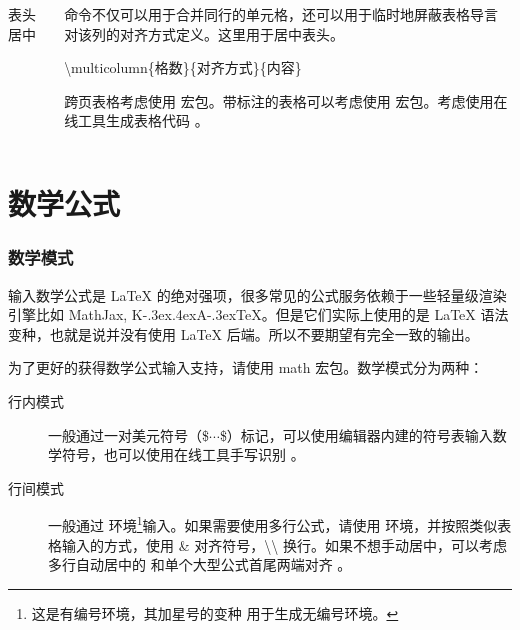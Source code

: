 {\begin{frame}[fragile]
\begin{columns}
\begin{column}{0.6\textwidth}
\begin{codeblock}[]{表头居中}
      \end{codeblock}
    \end{column}
    \begin{column}{0.4\textwidth}
       命令不仅可以用于合并同行的单元格，还可以用于临时地屏蔽表格导言对该列的对齐方式定义。这里用于居中表头。
      \begin{center}
        \parbox{0.85\linewidth}{
          \ttfamily\color{blue}\textbackslash{}multicolumn\{格数\}\{对齐方式\}\{内容\}
        }
      \end{center}
      跨页表格考虑使用  宏包。带标注的表格可以考虑使用  宏包。考虑使用在线工具生成表格代码 。
    \end{column}
  \end{columns}
\end{frame}

\section{数学公式}
\begin{frame}
  \frametitle{数学模式}
  \begin{alertblock}{}
  输入数学公式是 \LaTeX{} 的绝对强项，很多常见的公式服务依赖于一些轻量级渲染引擎比如 MathJax, K\kern-.3ex\raise.4ex\hbox{\footnotesize A}\kern-.3ex\TeX{}。但是它们实际上使用的是 \LaTeX{} 语法变种，也就是说并没有使用 \LaTeX{} 后端。所以不要期望有完全一致的输出。
  \end{alertblock}
  
  为了更好的获得数学公式输入支持，请使用 math 宏包。数学模式分为两种：
  \begin{description}
    \item[行内模式] 一般通过一对美元符号（\$$\cdots$\$）标记，可以使用编辑器内建的符号表输入数学符号，也可以使用在线工具手写识别 。
    \item[行间模式] 一般通过  环境\footnote{这是有编号环境，其加星号的变种  用于生成无编号环境。}输入。如果需要使用多行公式，请使用  环境，并按照类似表格输入的方式，使用 \& 对齐符号，\textbackslash\textbackslash{} 换行。如果不想手动居中，可以考虑多行自动居中的  和单个大型公式首尾两端对齐 。
  \end{description}
\end{frame}

}
